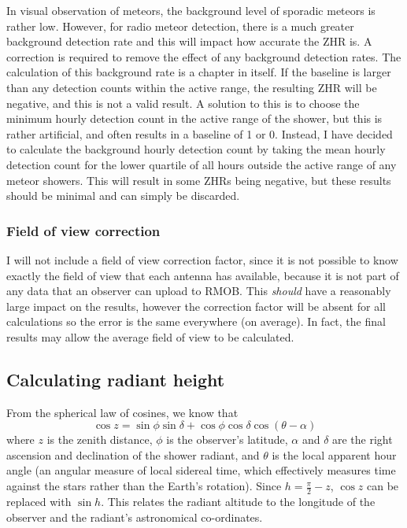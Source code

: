 In visual observation of meteors, the background level of sporadic meteors is
rather low. However, for radio meteor detection, there is a much greater
background detection rate and this will impact how accurate the ZHR is. A
correction is required to remove the effect of any background detection rates.
The calculation of this background rate is a chapter in itself. If the baseline
is larger than any detection counts within the active range, the resulting ZHR
will be negative, and this is not a valid result. A solution to this is to
choose the minimum hourly detection count in the active range of the shower,
but this is rather artificial, and often results in a baseline of 1 or 0.
Instead, I have decided to calculate the background hourly detection count by
taking the mean hourly detection count for the lower quartile of all hours
outside the active range of any meteor showers. This will result in some ZHRs
being negative, but these results should be minimal and can simply be
discarded.

\subsubsection{Field of view correction}

I will not include a field of view correction factor, since it is not possible
to know exactly the field of view that each antenna has available, because it
is not part of any data that an observer can upload to RMOB. This
\textit{should} have a reasonably large impact on the results, however the
correction factor will be absent for all calculations so the error is the same
everywhere (on average). In fact, the final results may allow the average field
of view to be calculated.

\subsection{Calculating radiant height}

From the spherical law of cosines, we know that
\[ \cos z =  \sin \phi \sin \delta + \cos \phi \cos \delta \cos \left( \theta -\alpha \right)\] 
where $z$ is the zenith distance, $\phi$ is the observer's latitude, $\alpha$
and $\delta$ are the right ascension and declination of the shower radiant, and
$\theta$ is the local apparent hour angle (an angular measure of local sidereal
time, which effectively measures time against the stars rather than the Earth's
rotation).  Since $h = \frac{\pi}{2} - z$, $\cos z$ can be replaced with $\sin
h$. This relates the radiant altitude to the longitude of the observer and the
radiant's astronomical co-ordinates.

